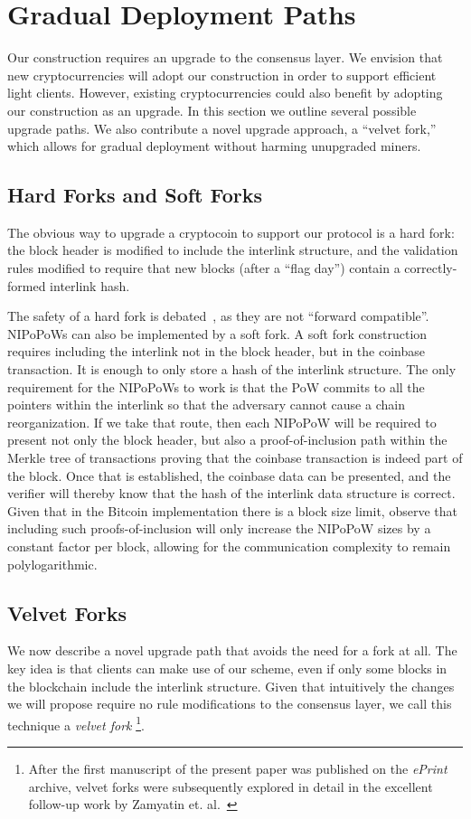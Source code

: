 \section{Gradual Deployment Paths}

\label{sec.forks}
Our construction requires an upgrade to the consensus layer. We envision that
new cryptocurrencies will adopt our construction in order to support efficient
light clients. However, existing cryptocurrencies could also benefit by adopting
our construction as an upgrade. In this section we outline several possible
upgrade paths. We also contribute a novel upgrade approach, a ``velvet fork,''
which allows for gradual deployment without harming unupgraded miners.

\subsection{Hard Forks and Soft Forks}
The obvious way to upgrade a cryptocoin to support our protocol is a hard fork:
the block header is modified to include the interlink structure, and the
validation rules modified to require that new blocks (after a ``flag day'')
contain a correctly-formed interlink hash.

The safety of a hard fork is debated~\cite{vitalikforks}, as they are not
``forward compatible''. NIPoPoWs can also be implemented by a soft fork. A soft
fork construction requires including the interlink not in the block header, but
in the coinbase transaction. It is enough to only store a hash of the interlink
structure. The only requirement for the NIPoPoWs to work is that the PoW commits
to all the pointers within the interlink so that the adversary cannot cause a
chain reorganization. If we take that route, then each NIPoPoW will be required
to present not only the block header, but also a proof-of-inclusion path within
the Merkle tree of transactions proving that the coinbase transaction is indeed
part of the block. Once that is established, the coinbase data can be presented,
and the verifier will thereby know that the hash of the interlink data structure
is correct. Given that in the Bitcoin implementation there is a block size
limit, observe that including such proofs-of-inclusion will only increase the
NIPoPoW sizes by a constant factor per block, allowing for the communication
complexity to remain polylogarithmic.

\subsection{Velvet Forks}
We now describe a novel upgrade path that avoids the need for a fork at all. The
key idea is that clients can make use of our scheme, even if only some blocks in
the blockchain include the interlink structure. Given that intuitively the
changes we will propose require no rule modifications to the consensus layer, we call this
technique a \textit{velvet fork}
\ifanonymous\else
\footnote{After the first manuscript of the present paper was published on the
\textit{ePrint} archive, velvet forks were subsequently explored in detail in
the excellent follow-up work by Zamyatin et. al.~\cite{velvet}}.
\fi

